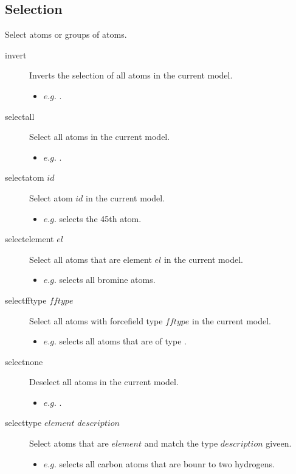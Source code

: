 \subsection{Selection}
Select atoms or groups of atoms.\\
\begin{description}

	\item[invert\its] Inverts the selection of all atoms in the current model.
	\begin{itemize}
		\item $e.g.$ .
	\end{itemize}

	\item[selectall\its] Select all atoms in the current model.
	\begin{itemize}
		\item $e.g.$ .
	\end{itemize}

	\item[selectatom $id$\its] Select atom $id$ in the current model.
	\begin{itemize}
		\item $e.g.$  selects the 45th atom.
	\end{itemize}

	\item[selectelement $el$\its] Select all atoms that are element $el$ in the current model.
	\begin{itemize}
		\item $e.g.$  selects all bromine atoms.
	\end{itemize}

	\item[selectfftype $fftype$\its] Select all atoms with forcefield type $fftype$ in the current model.
	\begin{itemize}
		\item $e.g.$  selects all atoms that are of type .
	\end{itemize}

	\item[selectnone\its] Deselect all atoms in the current model.
	\begin{itemize}
		\item $e.g.$ .
	\end{itemize}

	\item[selecttype $element$ $description$\its] Select atoms that are $element$ and match the type $description$ giveen.
	\begin{itemize}
		\item $e.g.$  selects all carbon atoms that are bounr to two hydrogens.
	\end{itemize}

\end{description}


